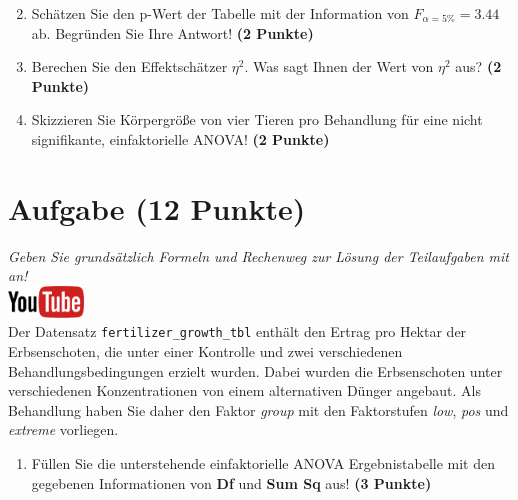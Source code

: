 \documentclass[a4paper, 9pt]{scrartcl}\usepackage[]{graphicx}\usepackage[]{xcolor}
\begin{document}
\vspace{1Ex}

\begin{enumerate}
  \setcounter{enumi}{1}
\item Sch{\"a}tzen Sie den p-Wert der Tabelle mit der Information von
  $F_{\alpha = 5\%} = 3.44$ ab. Begr{\"u}nden Sie Ihre
  Antwort! \textbf{(2 Punkte)}
\item Berechen Sie den Effektsch{\"a}tzer $\eta^2$. Was sagt Ihnen der Wert von
  $\eta^2$ aus? \textbf{(2 Punkte)}
\item Skizzieren Sie K{\"o}rpergr{\"o}{\ss}e von vier Tieren pro Behandlung f{\"u}r eine
  nicht signifikante, einfaktorielle ANOVA! \textbf{(2 Punkte)}
\end{enumerate}



 
\clearpage

\section{Aufgabe \hfill (12 Punkte)}

\textit{Geben Sie grunds{\"a}tzlich Formeln und Rechenweg zur L{\"o}sung der
  Teilaufgaben mit an!} \\[1Ex]

\hfill\href{https://youtu.be/49hvImMwVyE}{\includegraphics[width =
  2cm]{img/youtube}}\\[1Ex]




Der Datensatz \texttt{fertilizer\_growth\_tbl} enth{\"a}lt den Ertrag pro Hektar der
Erbsenschoten, die unter einer Kontrolle und zwei
verschiedenen Behandlungsbedingungen erzielt wurden. Dabei wurden die
Erbsenschoten unter verschiedenen Konzentrationen von einem alternativen
D{\"u}nger angebaut. Als Behandlung haben Sie daher den Faktor \textit{group} mit den
Faktorstufen \textit{low}, \textit{pos} und
\textit{extreme} vorliegen.



\begin{enumerate}
\item F{\"u}llen Sie die unterstehende einfaktorielle ANOVA Ergebnistabelle
  mit den gegebenen Informationen von \textbf{Df} und \textbf{Sum Sq} aus!
  \textbf{(3 Punkte)}
\end{enumerate}
\end{document}

